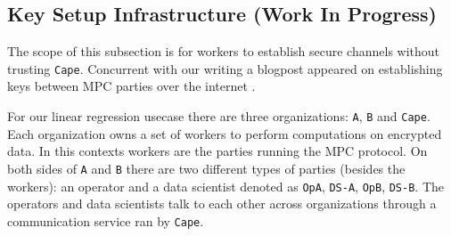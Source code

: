 \subsection{Key Setup Infrastructure (Work In Progress)}

The scope of this subsection is for workers to establish secure channels
without trusting \verb|Cape|. Concurrent with our writing a blogpost
appeared on establishing keys between MPC parties over the internet \cite{url-zengo}.

For our linear regression usecase there are three organizations: \verb|A|,
\verb|B| and \verb|Cape|.  Each organization owns a set of workers to perform
computations on encrypted data.  In this contexts workers are the parties
running the MPC protocol.  On both sides of \verb|A| and \verb|B| there are
two different types of parties (besides the workers): an operator and a data
scientist denoted as \verb|OpA|, \verb|DS-A|, \verb|OpB|, \verb|DS-B|.  The
operators and data scientists talk to each other across organizations through
a communication service ran by \verb|Cape|.

